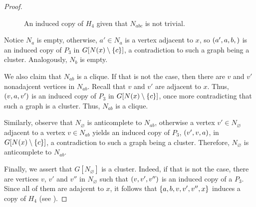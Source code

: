 \begin{proof}
    \begin{figure}[htb!]
        \centering
        \caption{An induced copy of $H_4$ given that $N_{abc}$ is not trivial.}
        \label{fig:3_bag_8}
    \end{figure}

    Notice $N_a$ is empty, otherwise, $a'\in N_a$ is a vertex adjacent to $x$,
    so $\left(a',a,b,\right)$ is an induced copy of $P_3$ in $G[N(x)\setminus\left\{c\right\}]$, a
    contradiction to such a graph being a cluster. Analogously, $N_b$ is empty.
    
    We also claim that $N_{ab}$ is a clique. If that is not the case, then there
    are $v$ and $v'$ nonadajcent vertices in $N_{ab}$. Recall that $v$ and $v'$
    are adjacent to $x$. Thus, $\left(v,a,v'\right)$ is an induced copy of $P_3$ in
    $G[N(x)\setminus\left\{c\right\}]$, once more contradicting that such a graph is a
    cluster. Thus, $N_{ab}$ is a clique.

    Similarly, observe that $N_\varnothing$ is anticomplete to $N_{ab}$,
    otherwise a vertex $v'\in N_\varnothing$ adjacent to a vertex $v\in N_{ab}$
    yields an induced copy of $P_3$, $\left(v',v,a\right)$, in $G[N(x)\setminus\left\{c\right\}]$, a
    contradiction to such a graph being a cluster. Therefore, $N_\varnothing$ is
    anticomplete to $N_{ab}$.

    Finally, we assert that $G[N_\varnothing]$ is a cluster. Indeed, if that is
    not the case, there are vertices $v$, $v'$ and $v''$ in $N_\varnothing$ such
    that $\left(v,v',v''\right)$ is an induced copy of a $P_3$. Since all of them are
    adajcent to $x$, it follows that $\left\{a,b,v,v',v'',x\right\}$ induces a copy of
    $H_4$ (see ).


\end{proof}
